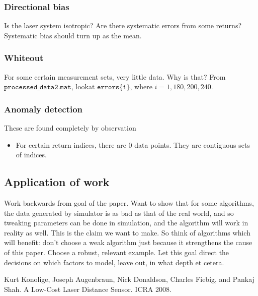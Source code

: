 \documentclass[a4paper, 11pt]{article}
\begin{document}
\subsubsection*{Directional bias}
Is the laser system isotropic? Are there systematic errors from some returns? Systematic bias should turn up as the mean.

\subsubsection*{Whiteout}
For some certain measurement sets, very little data. Why is that? From $\mathtt{processed\_data2.mat}$, lookat $\mathtt{errors\{i\}}$, where $i = 1, 180, 200, 240$.

\subsubsection*{Anomaly detection}
These are found completely by observation
  \begin{itemize}
  \item For certain return indices, there are $0$ data points. They are contiguous sets of indices.
  \end{itemize}

\subsection{Application of work}
Work backwards from goal of the paper. Want to show that for some algorithms, the data generated by simulator is as bad as that of the real world, and so tweaking parameters can be done in simulation, and the algorithm will work in reality as well. This is the claim we want to make. So think of algorithms which will benefit: don't choose a weak algorithm just because it strengthens the cause of this paper. Choose a robust, relevant example. Let this goal direct the decisions on which factors to model, leave out, in what depth et cetera.


\begin{comment}
  \begin{align*}

  \end{align*}

  \begin{itemize}
    \item
  \end{itemize}
\end{comment}

\begin{thebibliography}{9}

Kurt Konolige, Joseph Augenbraun, Nick Donaldson, Charles Fiebig, and Pankaj Shah. A Low-Cost Laser Distance Sensor. ICRA 2008.

\end{thebibliography}
\end{document}
